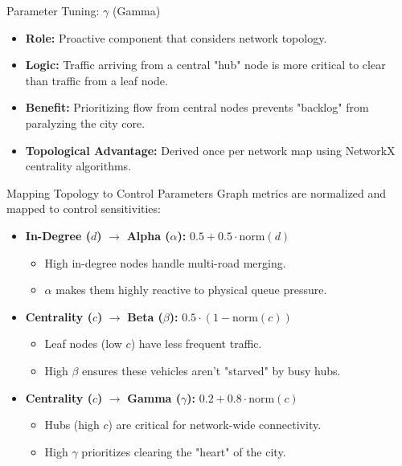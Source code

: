 \documentclass{beamer}
\begin{document}
\begin{frame}{Parameter Tuning: $\gamma$ (Gamma)}
    \begin{itemize}
        \item \textbf{Role:} Proactive component that considers network topology. \pause
        \item \textbf{Logic:} Traffic arriving from a central "hub" node is more critical to clear than traffic from a leaf node. \pause
        \item \textbf{Benefit:} Prioritizing flow from central nodes prevents "backlog" from paralyzing the city core. \pause
        \item \textbf{Topological Advantage:} Derived once per network map using NetworkX centrality algorithms.
    \end{itemize}
\end{frame}

\begin{frame}{Mapping Topology to Control Parameters}
    Graph metrics are normalized and mapped to control sensitivities: \pause
    \begin{itemize}
        \item \textbf{In-Degree ($d$)} $\rightarrow$ \textbf{Alpha ($\alpha$):} $0.5 + 0.5 \cdot \text{norm}(d)$
            \begin{itemize}
                \item High in-degree nodes handle multi-road merging.
                \item $\alpha$ makes them highly reactive to physical queue pressure. \pause
            \end{itemize}
        \item \textbf{Centrality ($c$)} $\rightarrow$ \textbf{Beta ($\beta$):} $0.5 \cdot (1 - \text{norm}(c))$
            \begin{itemize}
                \item Leaf nodes (low $c$) have less frequent traffic.
                \item High $\beta$ ensures these vehicles aren't "starved" by busy hubs. \pause
            \end{itemize}
        \item \textbf{Centrality ($c$)} $\rightarrow$ \textbf{Gamma ($\gamma$):} $0.2 + 0.8 \cdot \text{norm}(c)$
            \begin{itemize}
                \item Hubs (high $c$) are critical for network-wide connectivity.
                \item High $\gamma$ prioritizes clearing the "heart" of the city.
            \end{itemize}
    \end{itemize}
\end{frame}
\end{document}
